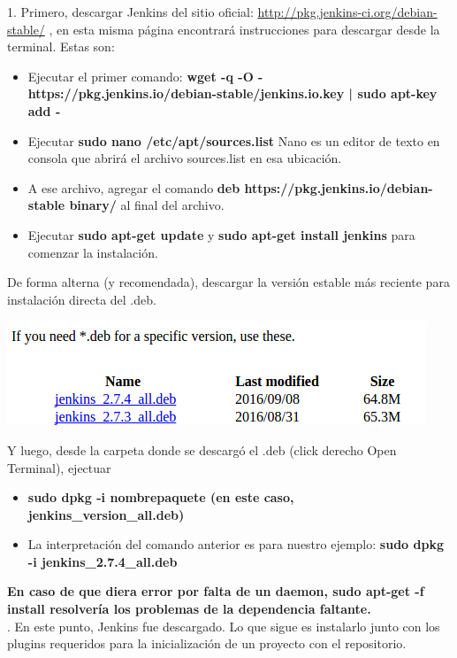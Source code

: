 \documentclass[a4paper]{article}
\newcommand\tab[1][0.55cm]{\hspace*{#1}}
\begin{document}
{1. Primero, descargar Jenkins del sitio oficial: 
\url {http://pkg.jenkins-ci.org/debian-stable/} , en esta misma página encontrará instrucciones para descargar desde la terminal. Estas son: 
	\begin{itemize}
    \item Ejecutar el primer comando: \textbf{ wget -q -O - https://pkg.jenkins.io/debian-stable/jenkins.io.key | sudo apt-key add -}
    \item Ejecutar \textbf{sudo nano /etc/apt/sources.list} Nano es un editor de texto en consola que abrirá el archivo sources.list en esa ubicación. 
    \item A ese archivo, agregar el comando \textbf{ deb https://pkg.jenkins.io/debian-stable binary/ } al final del archivo. 
    \item Ejecutar \textbf{sudo apt-get update} y 
\textbf {sudo apt-get install jenkins} para comenzar la instalación. 
    \end{itemize}
    
    De forma alterna (y recomendada), descargar la versión estable más reciente para instalación directa del .deb. 

\centering
	\includegraphics[scale=0.5]{jenkinsdeb}
\justify

\tab 	Y luego, desde la carpeta donde se descargó el .deb (click derecho Open Terminal), ejectuar 
    \begin{itemize}
    \item \textbf {sudo dpkg -i nombrepaquete (en este caso, jenkins\_version\_all.deb)}
	\item La interpretación del comando anterior es para nuestro ejemplo: \textbf{sudo dpkg -i jenkins\_2.7.4\_all.deb}
    \end{itemize}
    
    \textbf{En caso de que diera error por falta de un daemon, sudo apt-get -f install resolvería los problemas de la dependencia faltante.}\\
    
. En este punto, Jenkins fue descargado. Lo que sigue es instalarlo junto con los plugins requeridos para la inicialización de un proyecto con el repositorio. 
    
}
\end{document}
